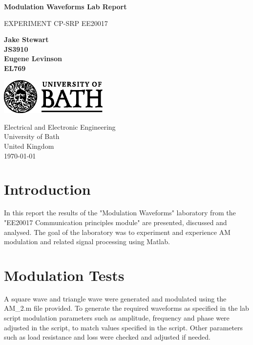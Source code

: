 \documentclass[a4paper]{article}
\begin{document}
\begin{titlepage}
    \begin{center}
        \vspace*{1cm}

        \Huge
        \textbf{Modulation Waveforms Lab Report}

        \vspace{0.5cm}
        \LARGE
        EXPERIMENT CP-SRP
        EE20017
        
        \vspace{1.5cm}

        \textbf{Jake Stewart}\\
        \textbf{JS3910}\\

        \textbf{Eugene Levinson}\\
        \textbf{EL769}\\
        \vspace{0.8cm}

        \vfill
        \includegraphics[width=0.4\textwidth]{university_logo.png}

        \Large
        Electrical and Electronic Engineering\\
        University of Bath\\
        United Kingdom\\
        \today
        

    \end{center}
\end{titlepage}

\newpage
\tableofcontents
\newpage

\section{Introduction}
In this report the results of the "Modulation Waveforms" laboratory from the "EE20017 Communication principles module" are presented, discussed and analysed. The goal of the laboratory was to experiment and experience AM modulation and related signal processing using Matlab.

\section{Modulation Tests}
\noindent A square wave and triangle wave were generated and modulated using the AM\_2.m file provided. To generate the required waveforms as specified in the lab script modulation parameters such as amplitude, frequency and phase were adjusted in the script, to match values specified in the script. Other parameters such as load resistance and loss were checked and adjusted if needed. \\
\end{document}

